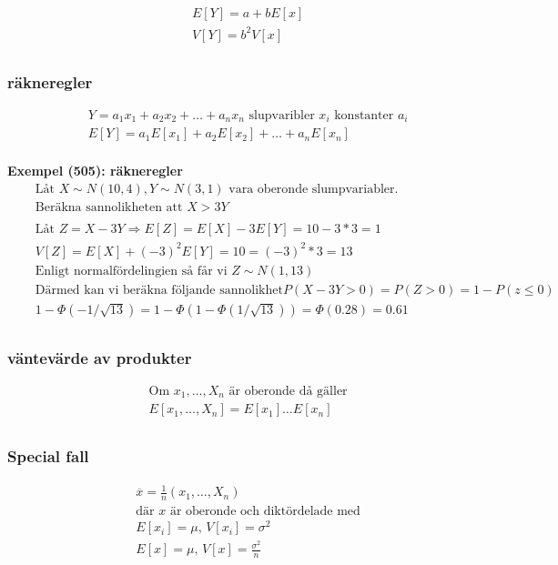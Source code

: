 \begin{align*}
  &\quad  E[Y] = a+bE[x] \\
  &\quad  V[Y] = b^2V[x] \\
\end{align*}

\subsubsection{räkneregler}
\begin{align*}
  &\quad  Y = a_1x_1 + a_2x_2 + \ldots+ a_n x_n \text{ slupvaribler $x_i$ konstanter $a_i$} \\
  &\quad  E[Y] =  a_1 E[x_1] + a_2 E[x_2] + \ldots + a_n E[x_n] \\
\end{align*}

\noindent\textbf{Exempel (505): räkneregler}
\begin{align*}
  &\quad  \text{Låt $X\sim N(10,4), Y\sim N(3,1)$ vara oberonde slumpvariabler.} \\
  &\quad  \text{Beräkna sannolikheten att $X>3Y$} \\
  &\quad  \\
  &\quad  \text{Låt } Z=X-3Y \Rightarrow E[Z]=E[X]-3E[Y]=10-3*3=1 \\
  &\quad  V[Z]=E[X]+(-3)^2E[Y]=10=(-3)^2*3=13 \\
  &\quad  \text{Enligt normalfördelingien så får vi } Z\sim N(1,13) \\
  &\quad  \text{Därmed kan vi beräkna följande sannolikhet} P(X-3Y>0)=P(Z>0)=1-P(z\leq0) \\
  &\quad  1-\Phi(-1/\sqrt{13})=1-\Phi(1-\Phi(1/\sqrt{13})) = \Phi(0.28) = 0.61 \\
\end{align*}

\subsubsection{väntevärde av produkter}
\begin{align*}
  &\quad  \text{Om $x_1,\ldots,X_n$ är oberonde då gäller}\\
  &\quad  E[x_1,\ldots,X_n] = E[x_1] \ldots E[x_n] \\
\end{align*}

\subsubsection{Special fall}
\begin{align*}
  &\quad  \overline{x} = \frac{1}{n}(x_1,\ldots,X_n) \\
  &\quad  \text{där $x$ är oberonde och diktördelade med} \\
  &\quad  E[x_i] = \mu, \, V[x_i] = \sigma^2 \\
  &\quad  E[x] = \mu, \, V[x] = \frac{\sigma^2}{n} \\
\end{align*}


